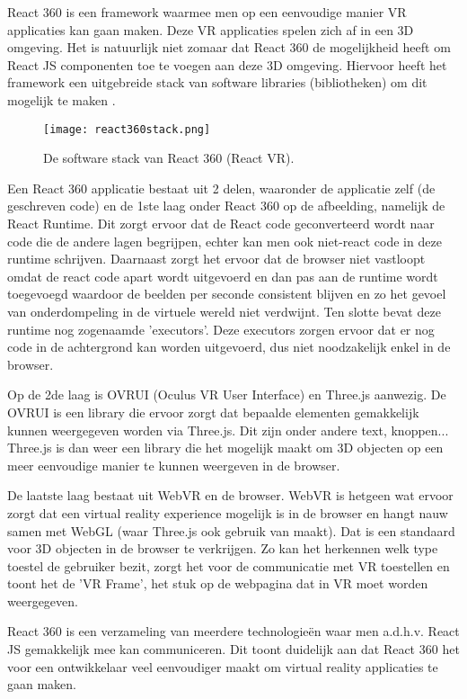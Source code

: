 React 360 is een framework waarmee men op een eenvoudige manier VR applicaties kan gaan maken. Deze VR applicaties spelen zich af in een 3D omgeving. Het is natuurlijk niet zomaar dat React 360 de mogelijkheid heeft om React JS componenten toe te voegen aan deze 3D omgeving. Hiervoor heeft het framework een uitgebreide stack van software libraries (bibliotheken) om dit mogelijk te maken \autocite{Bieronski2016}.

\begin{figure}[H]
	\centering
	\texttt{[image: react360stack.png]}
	\caption{De software stack van React 360 (React VR).}
	\label{fig:react360-stack}
\end{figure}

Een React 360 applicatie bestaat uit 2 delen, waaronder de applicatie zelf (de geschreven code) en de 1ste laag onder React 360 op de afbeelding,  namelijk de React Runtime. Dit zorgt ervoor dat de React code geconverteerd wordt naar code die de andere lagen begrijpen, echter kan men ook niet-react code in deze runtime schrijven. Daarnaast zorgt het ervoor dat de browser niet vastloopt omdat de react code apart wordt uitgevoerd en dan pas aan de runtime wordt toegevoegd waardoor de beelden per seconde consistent blijven en zo het gevoel van onderdompeling in de virtuele wereld niet verdwijnt. Ten slotte bevat deze runtime nog zogenaamde 'executors'. Deze executors zorgen ervoor dat er nog code in de achtergrond kan worden uitgevoerd, dus niet noodzakelijk enkel in de browser.

Op de 2de laag is OVRUI (Oculus VR User Interface) en Three.js aanwezig. De OVRUI is een library die ervoor zorgt dat bepaalde elementen gemakkelijk kunnen weergegeven worden via Three.js. Dit zijn onder andere text, knoppen... Three.js is dan weer een library die het mogelijk maakt om 3D objecten op een meer eenvoudige manier te kunnen weergeven in de browser.

De laatste laag bestaat uit WebVR en de browser. WebVR is hetgeen wat ervoor zorgt dat een virtual reality experience mogelijk is in de browser en hangt nauw samen met WebGL (waar Three.js ook gebruik van maakt). Dat is een standaard voor 3D objecten in de browser te verkrijgen. Zo kan het herkennen welk type toestel de gebruiker bezit, zorgt het voor de communicatie met VR toestellen en toont het de 'VR Frame', het stuk op de webpagina dat in VR moet worden weergegeven. 

React 360 is een verzameling van meerdere technologieën waar men a.d.h.v. React JS gemakkelijk mee kan communiceren. Dit toont duidelijk aan dat React 360 het voor een ontwikkelaar veel eenvoudiger maakt om virtual reality applicaties te gaan maken.

